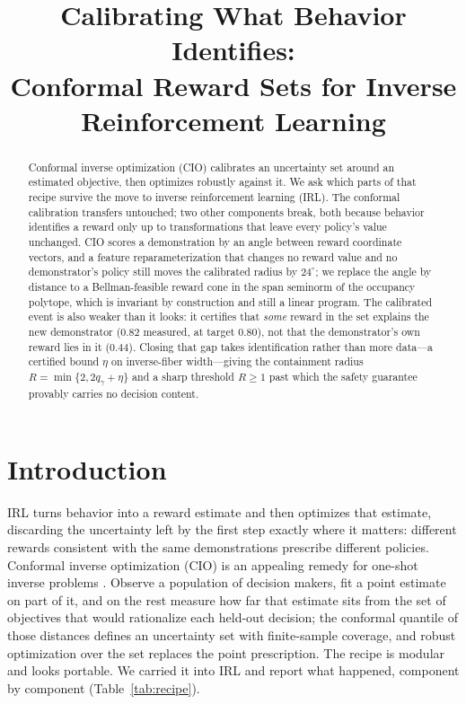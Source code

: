 \documentclass{article}
\title{Calibrating What Behavior Identifies:\\
Conformal Reward Sets for Inverse Reinforcement Learning}
\author{}
\begin{document}
\maketitle

\begin{abstract}
Conformal inverse optimization (CIO) calibrates an uncertainty set around an
estimated objective, then optimizes robustly against it. We ask which parts of
that recipe survive the move to inverse reinforcement learning (IRL). The
conformal calibration transfers untouched; two other components break, both
because behavior identifies a reward only up to transformations that leave every
policy's value unchanged. CIO scores a demonstration by an angle between reward
coordinate vectors, and a feature reparameterization that changes no reward
value and no demonstrator's policy still moves the calibrated radius by
$24^\circ$; we replace the angle by distance to a Bellman-feasible reward cone
in the span seminorm of the occupancy polytope, which is invariant by
construction and still a linear program. The calibrated event is also weaker
than it looks: it certifies that \emph{some} reward in the set explains the new
demonstrator ($0.82$ measured, at target $0.80$), not that the demonstrator's
own reward lies in it ($0.44$). Closing that gap takes identification rather
than more data---a certified bound $\eta$ on inverse-fiber width---giving the
containment radius $R=\min\{2,2q_\gamma+\eta\}$ and a sharp threshold $R\ge1$
past which the safety guarantee provably carries no decision content.
\end{abstract}

\section{Introduction}

IRL turns behavior into a reward estimate and then optimizes that estimate,
discarding the uncertainty left by the first step exactly where it matters:
different rewards consistent with the same demonstrations prescribe different
policies. Conformal inverse optimization (CIO) is an appealing remedy for
one-shot inverse problems \citep{lin2024conformal}. Observe a population of
decision makers, fit a point estimate on part of it, and on the rest measure how
far that estimate sits from the set of objectives that would rationalize each
held-out decision; the conformal quantile of those distances defines an
uncertainty set with finite-sample coverage, and robust optimization over the
set replaces the point prescription. The recipe is modular and looks portable.
We carried it into IRL and report what happened, component by component
(Table~\ref{tab:recipe}).
\end{document}
